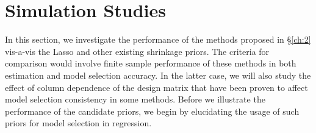 \documentclass[10pt]{article}
\def\sql{$\sqrt{\text{Lasso}}$}
\begin{document}
%
%


\section{Simulation Studies}\label{sec:sim}

In this section, we investigate the performance of the methods proposed in \S \ref{ch:2} vis-a-vis the Lasso and other existing shrinkage priors. The criteria for comparison would involve finite sample performance of these methods in both estimation and model selection accuracy. 
In the latter case, we will also study the effect of column dependence of the design matrix that have been proven to affect model selection consistency in some methods. Before we illustrate the performance of the candidate priors, we begin by elucidating the usage of such priors for model selection in regression. 
\end{document}
